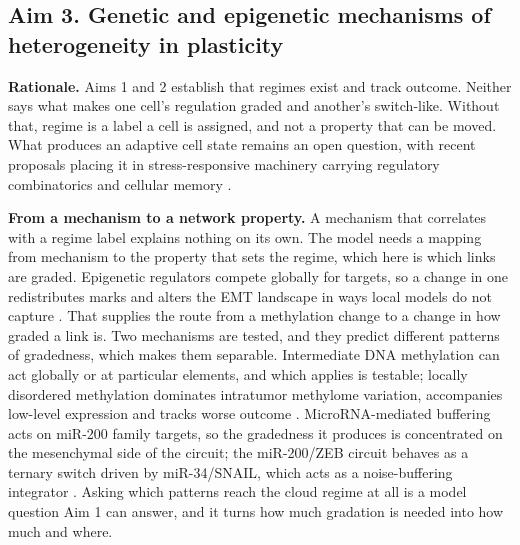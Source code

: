 \documentclass[12pt,letterpaper]{article}
\newcommand{\lead}[1]{\textbf{#1}}
\begin{document}
\subsection{Aim 3. Genetic and epigenetic mechanisms of heterogeneity in plasticity}

\lead{Rationale.} Aims 1 and 2 establish that regimes exist and track outcome. Neither says what makes one cell's regulation graded and another's switch-like. Without that, regime is a label a cell is assigned, and not a property that can be moved. What produces an adaptive cell state remains an open question, with recent proposals placing it in stress-responsive machinery carrying regulatory combinatorics and cellular memory \cite{franca2026}.

\lead{From a mechanism to a network property.} A mechanism that correlates with a regime label explains nothing on its own. The model needs a mapping from mechanism to the property that sets the regime, which here is which links are graded. Epigenetic regulators compete globally for targets, so a change in one redistributes marks and alters the EMT landscape in ways local models do not capture \cite{alradhawi2022}. That supplies the route from a methylation change to a change in how graded a link is. Two mechanisms are tested, and they predict different patterns of gradedness, which makes them separable. Intermediate DNA methylation can act globally or at particular elements, and which applies is testable; locally disordered methylation dominates intratumor methylome variation, accompanies low-level expression and tracks worse outcome \cite{landau2014}. MicroRNA-mediated buffering acts on miR-200 family targets, so the gradedness it produces is concentrated on the mesenchymal side of the circuit; the miR-200/ZEB circuit behaves as a ternary switch driven by miR-34/SNAIL, which acts as a noise-buffering integrator \cite{lu2013}. Asking which patterns reach the cloud regime at all is a model question Aim 1 can answer, and it turns how much gradation is needed into how much and where.
\end{document}
